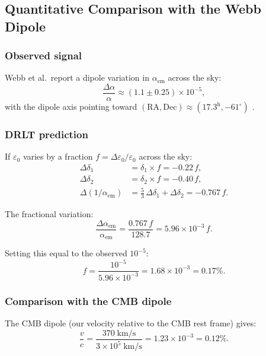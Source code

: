 \documentclass[12pt]{article}
\theoremstyle{remark}
\theoremstyle{definition}
\begin{document}
\subsection{Quantitative Comparison with the Webb Dipole}

\subsubsection{Observed signal}

Webb et al.\ report a dipole variation in $\alpha_\text{em}$ across the sky:
\begin{equation}
\frac{\Delta\alpha}{\alpha} \approx (1.1 \pm 0.25) \times 10^{-5},
\end{equation}
with the dipole axis pointing toward $(\text{RA}, \text{Dec}) \approx (17.3^\text{h}, -61^\circ)$ \cite{Webb}.

\subsubsection{DRLT prediction}

If $\varepsilon_0$ varies by a fraction $f = \Delta\varepsilon_0/\varepsilon_0$ across the sky:
\begin{align}
\Delta\delta_1 &= \delta_1 \times f = -0.22\,f, \\
\Delta\delta_2 &= \delta_2 \times f = -0.40\,f, \\
\Delta(1/\alpha_\text{em}) &= \tfrac{5}{3}\,\Delta\delta_1 + \Delta\delta_2 = -0.767\,f.
\end{align}

The fractional variation:
\begin{equation}
\frac{\Delta\alpha_\text{em}}{\alpha_\text{em}} = \frac{0.767\,f}{128.7} = 5.96 \times 10^{-3}\,f.
\end{equation}

Setting this equal to the observed $10^{-5}$:
\begin{equation}
\boxed{f = \frac{10^{-5}}{5.96 \times 10^{-3}} = 1.68 \times 10^{-3} = 0.17\%.}
\end{equation}

\subsubsection{Comparison with the CMB dipole}

The CMB dipole (our velocity relative to the CMB rest frame) gives:
\begin{equation}
\frac{v}{c} = \frac{370\;\text{km/s}}{3 \times 10^5\;\text{km/s}} = 1.23 \times 10^{-3} = 0.12\%.
\end{equation}
\end{document}
